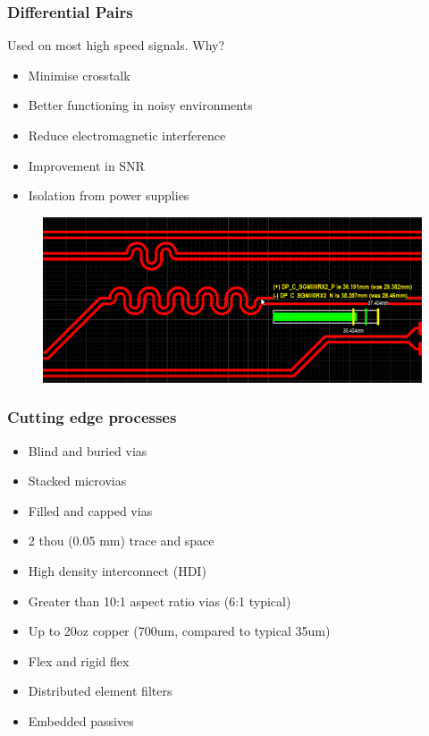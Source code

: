 \documentclass[t]{beamer}
\begin{document}
\begin{frame}
\frametitle{Differential Pairs}
Used on most high speed signals. Why?\\
\begin{itemize}
	\item Minimise crosstalk
	\item Better functioning in noisy environments
	\item Reduce electromagnetic interference 
	\item Improvement in SNR
	\item Isolation from power supplies
\end{itemize}
\begin{figure}
	\includegraphics[width=0.9\linewidth]{DiffPair_LengthTuning.png}
\end{figure}

\end{frame}
\begin{frame}
	\frametitle{Cutting edge processes}
	\begin{itemize}
		\item Blind and buried vias 
		\item Stacked microvias
		\item Filled and capped vias
		\item 2 thou (0.05 mm) trace and space
		\item High density interconnect (HDI)
		\item Greater than 10:1 aspect ratio vias (6:1 typical)
		\item Up to 20oz copper (700um, compared to typical 35um)
		\item Flex and rigid flex
		\item Distributed element filters
		\item Embedded passives
	\end{itemize}
\end{frame}
\end{document}
